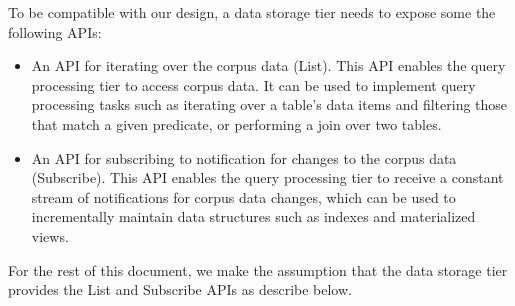 
To be compatible with our design, a data storage tier needs to expose some the following APIs:
\begin{itemize}
  \item An API for iterating over the corpus data (List).
  This API enables the query processing tier to access corpus data.
  It can be used to implement query processing tasks such as iterating over a table's data items and filtering those that
  match a given predicate, or performing a join over two tables.

  \item An API for subscribing to notification for changes to the corpus data (Subscribe).
  This API enables the query processing tier to receive a constant stream of notifications for corpus data changes,
  which can be used to incrementally maintain data structures such as indexes and materialized views.
\end{itemize}



For the rest of this document,
we make the assumption that the data storage tier provides the List and Subscribe APIs as describe below.


